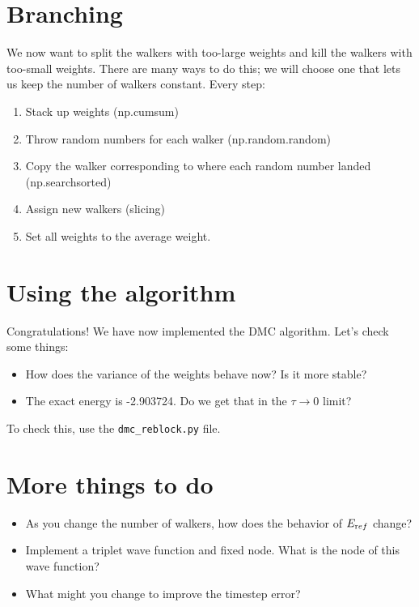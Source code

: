 \documentclass[12pt]{article}
\begin{document}
\section*{Branching} 

We now want to split the walkers with too-large weights and kill the walkers with too-small weights. 
There are many ways to do this; we will choose one that lets us keep the number of walkers constant. 
Every step:
\begin{enumerate}
\item Stack up weights (np.cumsum)
\item Throw random numbers for each walker (np.random.random)
\item Copy the walker corresponding to where each random number landed (np.searchsorted)
\item Assign new walkers (slicing)
\item Set all weights to the average weight.
\end{enumerate}
\section*{Using the algorithm}
Congratulations! We have now implemented the DMC algorithm. 
Let's check some things:


\begin{itemize}
\item How does the variance of the weights behave now? Is it more stable?
\item The exact energy is -2.903724. Do we get that in the $\tau\rightarrow0$ limit?
\end{itemize}

To check this, use the \texttt{dmc\_reblock.py} file.

\section*{More things to do}
\begin{itemize}
\item As you change the number of walkers, how does the behavior of $E_{\text ref}$ change?
\item Implement a triplet wave function and fixed node. What is the node of this wave function?
\item What might you change to improve the timestep error? 
\end{itemize}
\end{document}
